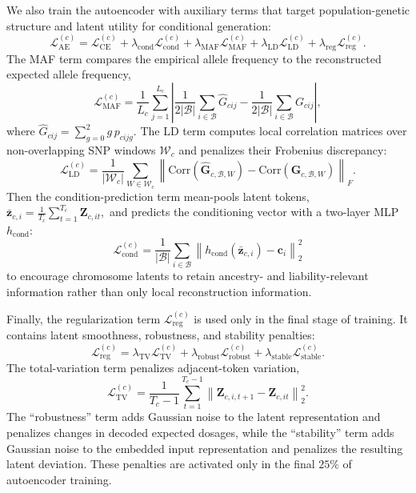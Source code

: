 \documentclass{article}
\begin{document}
We also train the autoencoder with auxiliary terms that target population-genetic structure and latent utility for conditional generation:
\[
\mathcal L_{\mathrm{AE}}^{(c)}
=
\mathcal L_{\mathrm{CE}}^{(c)}
+
\lambda_{\mathrm{cond}}\mathcal L_{\mathrm{cond}}^{(c)}
+
\lambda_{\mathrm{MAF}}\mathcal L_{\mathrm{MAF}}^{(c)}
+
\lambda_{\mathrm{LD}}\mathcal L_{\mathrm{LD}}^{(c)}
+
\lambda_{\mathrm{reg}}\mathcal L_{\mathrm{reg}}^{(c)} .
\]
The MAF term compares the empirical allele frequency to the reconstructed expected allele frequency,
\[
\mathcal L_{\mathrm{MAF}}^{(c)}
=
\frac{1}{L_c}
\sum_{j=1}^{L_c}
\left|
\frac{1}{2|\mathcal B|}\sum_{i\in\mathcal B}\widehat G_{cij}
-
\frac{1}{2|\mathcal B|}\sum_{i\in\mathcal B}G_{cij}
\right|,
\]
where \(\widehat G_{cij}=\sum_{g=0}^2 g\,p_{cijg}\). The LD term computes local correlation matrices over non-overlapping SNP windows \(\mathcal W_c\) and penalizes their Frobenius discrepancy:
\[
\mathcal L_{\mathrm{LD}}^{(c)}
=
\frac{1}{|\mathcal W_c|}
\sum_{W\in\mathcal W_c}
\left\|
\mathrm{Corr}(\widehat{\boldsymbol G}_{c,\mathcal B,W})
-
\mathrm{Corr}(\boldsymbol G_{c,\mathcal B,W})
\right\|_F .
\]
Then the condition-prediction term mean-pools latent tokens,
\(
\bar{\boldsymbol z}_{c,i}
=
\frac{1}{T_c}\sum_{t=1}^{T_c}\boldsymbol Z_{c,it},
\)
and predicts the conditioning vector with a two-layer MLP \(h_{\mathrm{cond}}\):
\[
\mathcal L_{\mathrm{cond}}^{(c)}
=
\frac{1}{|\mathcal B|}
\sum_{i\in\mathcal B}
\left\|
h_{\mathrm{cond}}(\bar{\boldsymbol z}_{c,i})-\boldsymbol c_i
\right\|_2^2
\]
to encourage chromosome latents to retain ancestry- and liability-relevant information rather than only local reconstruction information.

Finally, the regularization term \(\mathcal L_{\mathrm{reg}}^{(c)}\) is used only in the final stage of training. It contains latent smoothness, robustness, and stability penalties:
\[
\mathcal L_{\mathrm{reg}}^{(c)}
=
\lambda_{\mathrm{TV}}\mathcal L_{\mathrm{TV}}^{(c)}
+
\lambda_{\mathrm{robust}}\mathcal L_{\mathrm{robust}}^{(c)}
+
\lambda_{\mathrm{stable}}\mathcal L_{\mathrm{stable}}^{(c)} .
\]
The total-variation term penalizes adjacent-token variation,
\[
\mathcal L_{\mathrm{TV}}^{(c)}
=
\frac{1}{T_c-1}
\sum_{t=1}^{T_c-1}
\left\|
\boldsymbol Z_{c,i,t+1}-\boldsymbol Z_{c,it}
\right\|_2^2 .
\]
The ``robustness'' term adds Gaussian noise to the latent representation and penalizes changes in decoded expected dosages, while the ``stability'' term adds Gaussian noise to the embedded input representation and penalizes the resulting latent deviation. These penalties are activated only in the final \(25\%\) of autoencoder training.
\end{document}
